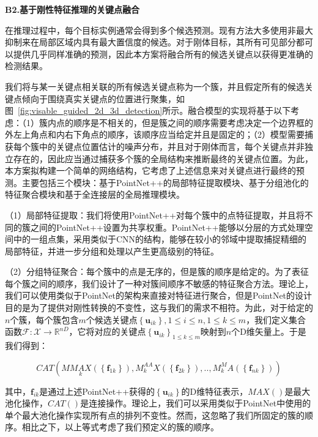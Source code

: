 \documentclass[12pt]{article}
\begin{document}
\textbf{B2.基于刚性特征推理的关键点融合}

在推理过程中，每个目标实例通常会得到多个候选预测。现有方法大多使用非最大抑制来在局部区域内具有最大置信度的候选。对于刚体目标，其所有可见部分都可以提供几乎同样准确的预测，因此本方案将融合所有的候选关键点以获得更准确的检测结果。

我们将与某一关键点相关联的所有候选关键点称为一个簇，并且假定所有的候选关键点倾向于围绕真实关键点的位置进行聚集，如图~\ref{fig:visable_guided_2d_3d_detection}所示。融合模型的实现将基于以下考虑：（1）簇内点的顺序是不相关的，但是簇之间的顺序需要考虑决定一个边界框的外左上角点和内右下角点的顺序，该顺序应当给定并且是固定的；（2）模型需要捕获每个簇中的关键点位置估计的噪声分布，并且对于刚体而言，每个关键点并非独立存在的，因此应当通过捕获多个簇的全局结构来推断最终的关键点位置。为此，本方案拟构建一个简单的网络结构，它考虑了上述信息来对关键点进行最终的预测。主要包括三个模块：基于PointNet++的局部特征提取模块、基于分组池化的特征聚合模块和基于全连接层的全局推理模块。

（1）局部特征提取：我们将使用PointNet++对每个簇中的点特征提取，并且将不同的簇之间的PointNet++设置为共享权重。PointNet++能够以分层的方式处理空间中的一组点集，采用类似于CNN的结构，能够在较小的邻域中提取捕捉精细的局部特征，并进一步分组和处理以产生更高级别的特征。

（2）分组特征聚合：每个簇中的点是无序的，但是簇的顺序是给定的。为了表征每个簇之间的顺序，我们设计了一种对簇间顺序不敏感的特征聚合方法。理论上，我们可以使用类似于PointNet的架构来直接对特征进行聚合，但是PointNet的设计目的是为了提供对刚性转换的不变性，这与我们的需求不相符。为此，对于给定的$n$个簇，每个簇包含$m$个候选关键点$\left\{\mathbf{u}_{i k}\right\}, 1 \leq i \leq n, 1 \leq k \leq m$，我们定义集合函数$\mathcal{F}: \mathcal{X} \rightarrow \mathbb{R}^{n D}$，它将对应的关键点$\left\{\mathbf{u}_{i k}\right\}_{1 \leq k \leq m}$映射到$n$个D维矢量上。于是我们得到：

\begin{equation}
C A T\left(M \underset{k}{M A X}\left(\left\{\mathbf{f}_{1 k}\right\}\right), M_k^{A A} X\left(\left\{\mathbf{f}_{2 k}\right\}\right), . ., M_k^M A\left(\left\{\mathbf{f}_{n k}\right\}\right)\right)
\end{equation}

其中，$\mathbf{f}_{i k}$是通过上述PointNet++获得的$\left\{\mathbf{u}_{i k}\right\}$的D维特征表示，$M A X()$是最大池化操作，$C A T()$是连接操作。理论上，我们可以采用类似于PointNet中使用的单个最大池化操作实现所有点的排列不变性。然而，这忽略了我们所固定的簇的顺序。相比之下，以上等式考虑了我们预定义的簇的顺序。
\end{document}
